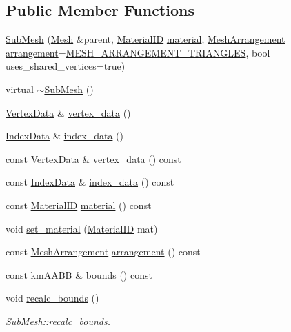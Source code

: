 \subsection*{Public Member Functions}
\begin{DoxyCompactItemize}
\item 
\hyperlink{classkglt_1_1_sub_mesh_ad5513ed3f25b9ed47380d8aced452a7b}{Sub\-Mesh} (\hyperlink{classkglt_1_1_mesh}{Mesh} \&parent, \hyperlink{namespacekglt_a5ffac6377a7d3e163b4d5c31f71db43a}{Material\-I\-D} \hyperlink{classkglt_1_1_sub_mesh_aa8ece9cc17fa6181a1df1b39dc3f3270}{material}, \hyperlink{namespacekglt_a4d5a692708f38d0176dd6f5d341289da}{Mesh\-Arrangement} \hyperlink{classkglt_1_1_sub_mesh_a91fc7dbd79e99dc76a2aa9284569dbfb}{arrangement}=\hyperlink{namespacekglt_a4d5a692708f38d0176dd6f5d341289daa10bc529bd0233d4686437519a810138d}{M\-E\-S\-H\-\_\-\-A\-R\-R\-A\-N\-G\-E\-M\-E\-N\-T\-\_\-\-T\-R\-I\-A\-N\-G\-L\-E\-S}, bool uses\-\_\-shared\-\_\-vertices=true)
\item 
virtual \hyperlink{classkglt_1_1_sub_mesh_afebf783eec695acbc279b84b2ca037b4}{$\sim$\-Sub\-Mesh} ()
\item 
\hyperlink{classkglt_1_1_vertex_data}{Vertex\-Data} \& \hyperlink{classkglt_1_1_sub_mesh_a4f98f5b755a1e16132585fcf6e695a7a}{vertex\-\_\-data} ()
\item 
\hyperlink{classkglt_1_1_index_data}{Index\-Data} \& \hyperlink{classkglt_1_1_sub_mesh_a16d80ad990d8f21acf9b72b7c311801a}{index\-\_\-data} ()
\item 
const \hyperlink{classkglt_1_1_vertex_data}{Vertex\-Data} \& \hyperlink{classkglt_1_1_sub_mesh_a471e8698ec355fa8b743e27b779ba687}{vertex\-\_\-data} () const 
\item 
const \hyperlink{classkglt_1_1_index_data}{Index\-Data} \& \hyperlink{classkglt_1_1_sub_mesh_ad955c838e794401a210952d1609964cd}{index\-\_\-data} () const 
\item 
const \hyperlink{namespacekglt_a5ffac6377a7d3e163b4d5c31f71db43a}{Material\-I\-D} \hyperlink{classkglt_1_1_sub_mesh_aa8ece9cc17fa6181a1df1b39dc3f3270}{material} () const 
\item 
void \hyperlink{classkglt_1_1_sub_mesh_af0d2fdbe85331042738ed53e8dd4f66d}{set\-\_\-material} (\hyperlink{namespacekglt_a5ffac6377a7d3e163b4d5c31f71db43a}{Material\-I\-D} mat)
\item 
const \hyperlink{namespacekglt_a4d5a692708f38d0176dd6f5d341289da}{Mesh\-Arrangement} \hyperlink{classkglt_1_1_sub_mesh_a91fc7dbd79e99dc76a2aa9284569dbfb}{arrangement} () const 
\item 
const km\-A\-A\-B\-B \& \hyperlink{classkglt_1_1_sub_mesh_a0b15e0e5454784d7daa9359b8f62c447}{bounds} () const 
\item 
void \hyperlink{classkglt_1_1_sub_mesh_ab89e8efac50989f93c62db9a222663d9}{recalc\-\_\-bounds} ()
\begin{DoxyCompactList}\small\item\em \hyperlink{classkglt_1_1_sub_mesh_ab89e8efac50989f93c62db9a222663d9}{Sub\-Mesh\-::recalc\-\_\-bounds}. \end{DoxyCompactList}\end{DoxyCompactItemize}
